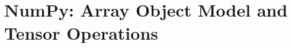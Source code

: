 
\appendix
\setcounter{section}{2}

\section{NumPy: Array Object Model and Tensor Operations}




% 
% 
% 


% 
% 
% 


% 
% 
% 


% 
% 

